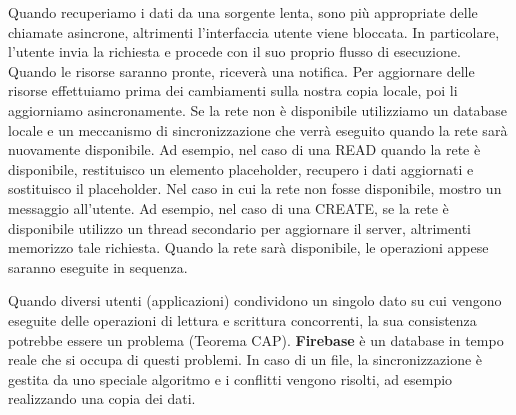 Quando recuperiamo i dati da una sorgente lenta, sono più appropriate delle chiamate asincrone, altrimenti l'interfaccia utente viene bloccata. In particolare, l'utente invia la richiesta e procede con il suo proprio flusso di esecuzione. Quando le risorse saranno pronte, riceverà una notifica. Per aggiornare delle risorse effettuiamo prima dei cambiamenti sulla nostra copia locale, poi li aggiorniamo asincronamente. Se la rete non è disponibile utilizziamo un database locale e un meccanismo di sincronizzazione che verrà eseguito quando la rete sarà nuovamente disponibile. Ad esempio, nel caso di una READ quando la rete è disponibile, restituisco un elemento placeholder, recupero i dati aggiornati e sostituisco il placeholder. Nel caso in cui la rete non fosse disponibile, mostro un messaggio all'utente. Ad esempio, nel caso di una CREATE, se la rete è disponibile utilizzo un thread secondario per aggiornare il server, altrimenti memorizzo tale richiesta. Quando la rete sarà disponibile, le operazioni appese saranno eseguite in sequenza.

Quando diversi utenti (applicazioni) condividono un singolo dato su cui vengono eseguite delle operazioni di lettura e scrittura concorrenti, la sua consistenza potrebbe essere un problema (Teorema CAP).
\textbf{Firebase} è un database in tempo reale che si occupa di questi problemi. In caso di un file, la sincronizzazione è gestita da uno speciale algoritmo e i conflitti vengono risolti, ad esempio realizzando una copia dei dati.

